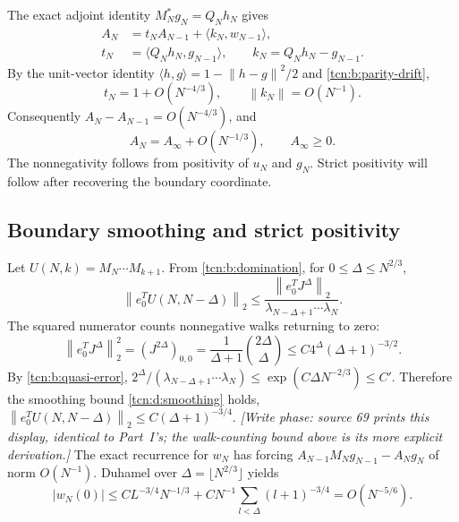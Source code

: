 \documentclass[11pt,letterpaper]{article}
\newcommand{\norm}[1]{\left\lVert#1\right\rVert}
\newcommand{\ip}[2]{\langle#1,#2\rangle}
\theoremstyle{remark}
\begin{document}
The exact adjoint identity $M_N^*g_N=Q_Nh_N$ gives
\begin{align*}
 A_N&=t_NA_{N-1}+\ip{k_N}{w_{N-1}},\\
 t_N&=\ip{Q_Nh_N}{g_{N-1}},\qquad k_N=Q_Nh_N-g_{N-1}.
\end{align*}
By the unit-vector identity $\ip hg=1-\norm{h-g}^2/2$ and \eqref{tcn:b:parity-drift},
\[
 t_N=1+O(N^{-4/3}),\qquad\norm{k_N}=O(N^{-1}).
\]
Consequently $A_N-A_{N-1}=O(N^{-4/3})$, and
\begin{equation}
 A_N=A_\infty+O(N^{-1/3}),\qquad A_\infty\ge0.              \label{tcn:b:amplitude-limit}
\end{equation}
The nonnegativity follows from positivity of $u_N$ and $g_N$. Strict positivity will follow after recovering the boundary coordinate.

\subsection{Boundary smoothing and strict positivity}\label{tcn:b:sec:route5}
Let $U(N,k)=M_N\cdots M_{k+1}$. From \eqref{tcn:b:domination}, for $0\le \Delta\le N^{2/3}$,
\[
 \norm{e_0^TU(N,N-\Delta)}_2
 \le\frac{\norm{e_0^TJ^\Delta}_2}{\lambda_{N-\Delta+1}\cdots\lambda_N}.
\]
The squared numerator counts nonnegative walks returning to zero:
\[
 \norm{e_0^TJ^\Delta}_2^2=(J^{2\Delta})_{0,0}
       =\frac1{\Delta+1}\binom{2\Delta}\Delta\le C4^\Delta(\Delta+1)^{-3/2}.
\]
By \eqref{tcn:b:quasi-error}, $2^\Delta/(\lambda_{N-\Delta+1}\cdots\lambda_N)
\le\exp(C\Delta N^{-2/3})\le C'$. Therefore the smoothing bound \eqref{tcn:d:smoothing} holds, $\norm{e_0^TU(N,N-\Delta)}_2\le C(\Delta+1)^{-3/4}$. \emph{[Write phase: source 69 prints this display, identical to Part~I's; the walk-counting bound above is its more explicit derivation.]}
The exact recurrence for $w_N$ has forcing
$A_{N-1}M_Ng_{N-1}-A_Ng_N$ of norm $O(N^{-1})$. Duhamel over $\Delta=\lfloor N^{2/3}\rfloor$ yields
\begin{equation}
 |w_N(0)|\le CL^{-3/4}N^{-1/3}
       +CN^{-1}\sum_{l<\Delta}(l+1)^{-3/4}=O(N^{-5/6}).          \label{tcn:b:endpoint-error}
\end{equation}
\end{document}

